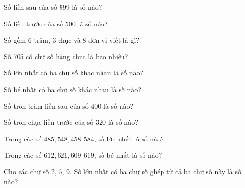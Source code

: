 \begin{ex}
Số liền sau của số 999 là số nào?
\end{ex}

\begin{ex}
Số liền trước của số 500 là số nào?
\end{ex}

\begin{ex}
Số gồm 6 trăm, 3 chục và 8 đơn vị viết là gì?
\end{ex}

\begin{ex}
Số 705 có chữ số hàng chục là bao nhiêu?
\end{ex}

\begin{ex}
Số lớn nhất có ba chữ số khác nhau là số nào?
\end{ex}

\begin{ex}
Số bé nhất có ba chữ số khác nhau là số nào?
\end{ex}

\begin{ex}
Số tròn trăm liền sau của số 400 là số nào?
\end{ex}

\begin{ex}
Số tròn chục liền trước của số 320 là số nào?
\end{ex}

\begin{ex}
Trong các số $485, 548, 458, 584$, số lớn nhất là số nào?
\end{ex}

\begin{ex}
Trong các số $612, 621, 609, 619$, số bé nhất là số nào?
\end{ex}

\begin{ex}
Cho các chữ số 2, 5, 9. Số lớn nhất có ba chữ số ghép từ cả ba chữ số này là số nào?
\end{ex}

